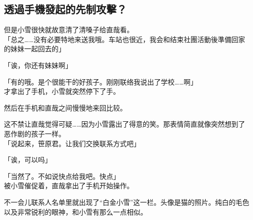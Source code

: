 \subsection{透過手機發起的先制攻擊？}

但是小雪很快就故意清了清嗓子给直哉看。\\

「总之……没有必要特地来送我哦。车站也很近，我会和结束社團活動後準備回家的妹妹一起回去的」

「诶，你还有妹妹啊」

「有的哦。是个很能干的好孩子。刚刚联络我说出了学校……啊」\\

才拿出了手机，小雪就突然停下了手。

然后在手机和直哉之间慢慢地来回比较。

这不禁让直哉觉得可疑……因为小雪露出了得意的笑。那表情简直就像突然想到了恶作剧的孩子一样。\\

「说起来，笹原君。让我们交换联系方式吧」

「诶，可以吗」

「当然了。不如说快点给我吧。快点」\\

被小雪催促着，直哉拿出了手机开始操作。

不一会儿联系人名单里就出现了“白金小雪”这一栏。头像是猫的照片。纯白的毛色以及非常锐利的眼神，和小雪有那么一点相似。\\

